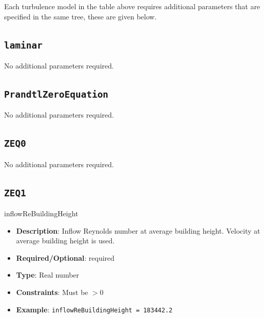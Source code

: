 

Each turbulence model in the table above requires additional parameters that are specified in the same tree, these are given below.

\newpage
\subsection*{\lstinline!laminar!}
No additional parameters required.



\newpage
\subsection*{\lstinline!PrandtlZeroEquation!}
No additional parameters required.



\newpage
\subsection*{\lstinline!ZEQ0!}
No additional parameters required.


\newpage
\subsection*{\lstinline!ZEQ1!}
inflowReBuildingHeight
\vspace{\the\parameterListSpacing}
\begin{itemize}
    \item {\bf Description}: Inflow Reynolds number at average building height. Velocity at average building height is used.
    \item {\bf Required/Optional}: required
    \item {\bf Type}: Real number
    \item {\bf Constraints}: Must be $>0$
    \item {\bf Example}: \lstinline!inflowReBuildingHeight = 183442.2!
\end{itemize}


